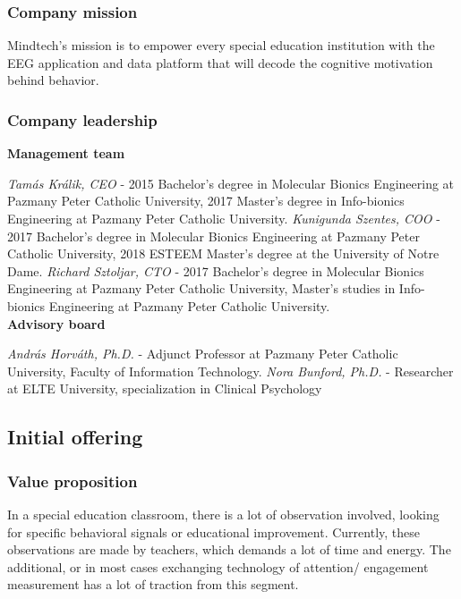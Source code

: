 \documentclass[letterpaper,10pt]{article}
\let\oldsubsection\subsection
\renewcommand{\subsection}{\def\cursectioning{subsection}\oldsubsection}
\begin{document}
\subsubsection{Company mission}

Mindtech's mission is to empower every special education institution with the EEG application and data platform that will decode the cognitive motivation behind behavior.

\subsubsection{Company leadership}

\textbf{Management team} 

\textit{Tamás Králik, CEO} - 2015 Bachelor’s degree in Molecular Bionics Engineering at Pazmany Peter Catholic University, 2017 Master's degree in Info-bionics Engineering at Pazmany Peter Catholic University. \textit{Kunigunda Szentes, COO} - 2017 Bachelor’s degree in Molecular Bionics Engineering at Pazmany Peter Catholic University, 2018 ESTEEM Master's degree at the University of Notre Dame. \textit{Richard Sztoljar, CTO} - 2017 Bachelor’s degree in Molecular Bionics Engineering at Pazmany Peter Catholic University, Master's studies in Info-bionics Engineering at Pazmany Peter Catholic University. \\
\textbf{Advisory board}

\textit{András Horváth, Ph.D.} - Adjunct Professor at Pazmany Peter Catholic University, Faculty of Information Technology. \textit{Nora Bunford, Ph.D.} - Researcher at ELTE University, specialization in Clinical Psychology 


\subsection{Initial offering} %

\subsubsection{Value proposition}

In a special education classroom, there is a lot of observation involved, looking for specific behavioral signals or educational improvement. Currently, these observations are made by teachers, which demands a lot of time and energy. The additional, or in most cases exchanging technology of attention/ engagement measurement has a lot of traction from this segment. 
\end{document}
